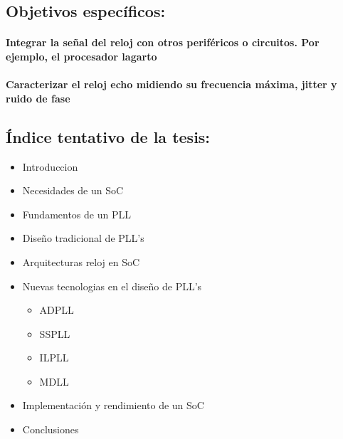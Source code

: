 \documentclass[runningheads,a4paper]{llncs}
\begin{document}
\subsection{Objetivos específicos:}
\paragraph{Integrar la señal del reloj con otros periféricos o circuitos. Por ejemplo, el procesador lagarto}
\paragraph{Caracterizar el reloj echo midiendo su frecuencia máxima, jitter y ruido de fase}


\subsection{Índice tentativo de la tesis:}
\begin{itemize}
\item Introduccion
\item Necesidades de un SoC
\item Fundamentos de un PLL
\item Diseño tradicional de PLL's
\item Arquitecturas reloj en SoC 
\item Nuevas tecnologias en el diseño de PLL's
\begin{itemize}
    \item ADPLL
    \item SSPLL
    \item ILPLL
    \item MDLL
\end{itemize}
\item Implementación y rendimiento de un SoC
\item Conclusiones
\end{itemize}
\end{document}
